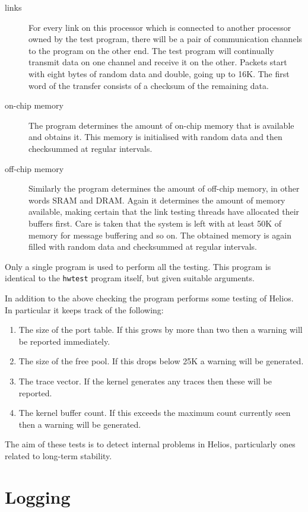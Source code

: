 \begin{description}
\item [links] For every link on this processor which is connected to another
processor owned by the test program, there will be a pair of communication
channels to the program on the other end. The test program will continually
transmit data on one channel and receive it on the other. Packets start
with eight bytes of random data and double, going up to 16K. The first word of
the transfer consists of a checksum of the remaining data.
\item [on-chip memory] The program determines the amount of on-chip
memory that is available and obtains it. This memory is initialised with
random data and then checksummed at regular intervals.
\item [off-chip memory] Similarly the program determines the amount of
off-chip memory, in other words SRAM and DRAM. Again it determines the
amount of memory available, making certain that the link testing
threads have allocated their buffers first. Care is taken that the system
is left with at least 50K of memory for message buffering and so on.
The obtained memory is again filled with random data and checksummed
at regular intervals.
\end{description}

Only a single program is used to perform all the testing. This program
is identical to the {\tt hwtest} program itself, but given suitable
arguments.

In addition to the above checking the program performs some testing
of Helios. In particular it keeps track of the following:

\begin{enumerate}
\item The size of the port table. If this grows by more than two then
a warning will be reported immediately.
\item The size of the free pool. If this drops below 25K a warning will
be generated.
\item The trace vector. If the kernel generates any traces then these
will be reported.
\item The kernel buffer count. If this exceeds the maximum count currently
seen then a warning will be generated.
\end{enumerate}

The aim of these tests is to detect internal problems in Helios,
particularly ones related to long-term stability.

\section{Logging}

